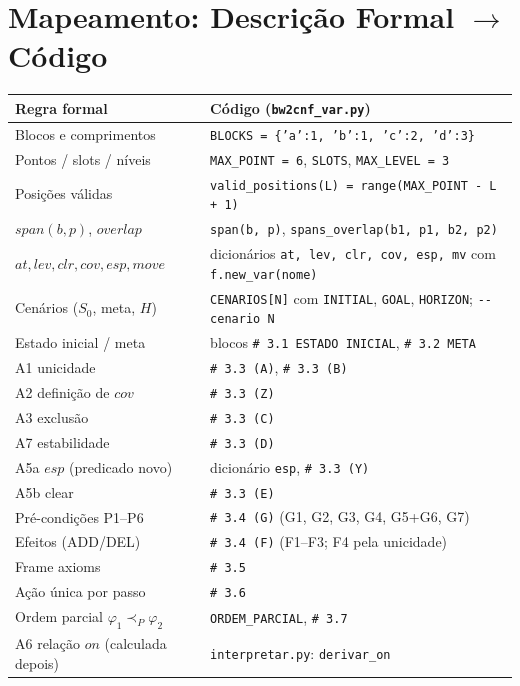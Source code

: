 \documentclass[11pt,a4paper]{article}
\newcommand{\clr}{\mathit{clr}}
\newcommand{\at}{\mathit{at}}
\newcommand{\lev}{\mathit{lev}}
\newcommand{\cov}{\mathit{cov}}
\newcommand{\esp}{\mathit{esp}}
\newcommand{\on}{\mathit{on}}
\newcommand{\mv}{\mathit{move}}
\newcommand{\spn}{\mathit{span}}
\newcommand{\ov}{\mathit{overlap}}
\begin{document}
\section{Mapeamento: Descrição Formal \texorpdfstring{$\to$}{->} Código}
\begin{center}\small
\begin{tabular}{@{}ll@{}}
\toprule
Regra formal & Código (\texttt{bw2cnf\_var.py})\\
\midrule
Blocos e comprimentos & \texttt{BLOCKS = \{'a':1, 'b':1, 'c':2, 'd':3\}}\\
Pontos / slots / níveis & \texttt{MAX\_POINT = 6}, \texttt{SLOTS}, \texttt{MAX\_LEVEL = 3}\\
Posições válidas & \texttt{valid\_positions(L) = range(MAX\_POINT - L + 1)}\\
$\spn(b,p)$, $\ov$ & \texttt{span(b, p)}, \texttt{spans\_overlap(b1, p1, b2, p2)}\\
$\at,\lev,\clr,\cov,\esp,\mv$ & dicionários \texttt{at, lev, clr, cov, esp, mv} com \texttt{f.new\_var(nome)}\\
Cenários ($S_0$, meta, $H$) & \texttt{CENARIOS[N]} com \texttt{INITIAL}, \texttt{GOAL}, \texttt{HORIZON}; \texttt{-{}-cenario N}\\
Estado inicial / meta & blocos \texttt{\# 3.1 ESTADO INICIAL}, \texttt{\# 3.2 META}\\
A1 unicidade & \texttt{\# 3.3 (A)}, \texttt{\# 3.3 (B)}\\
A2 definição de $\cov$ & \texttt{\# 3.3 (Z)}\\
A3 exclusão & \texttt{\# 3.3 (C)}\\
A7 estabilidade & \texttt{\# 3.3 (D)}\\
A5a $\esp$ (predicado novo) & dicionário \texttt{esp}, \texttt{\# 3.3 (Y)}\\
A5b clear & \texttt{\# 3.3 (E)}\\
Pré-condições P1--P6 & \texttt{\# 3.4 (G)} (G1, G2, G3, G4, G5+G6, G7)\\
Efeitos (ADD/DEL) & \texttt{\# 3.4 (F)} (F1--F3; F4 pela unicidade)\\
Frame axioms & \texttt{\# 3.5}\\
Ação única por passo & \texttt{\# 3.6}\\
Ordem parcial $\varphi_1\prec_P\varphi_2$ & \texttt{ORDEM\_PARCIAL}, \texttt{\# 3.7}\\
A6 relação $\on$ (calculada depois) & \texttt{interpretar.py}: \texttt{derivar\_on}\\
\bottomrule
\end{tabular}
\end{center}
\end{document}
